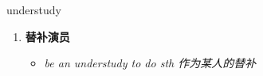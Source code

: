 
\begin{frame}
{\huge understudy}
\begin{center}
\begin{enumerate}\Large
  \item \textbf{替补演员}
  \begin{itemize}
    \item \em{\Large{be an understudy to do sth 作为某人的替补}}
  \end{itemize}
\end{enumerate}
\end{center}
\end{frame}
